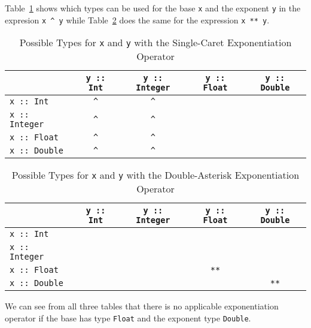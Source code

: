 
Table~\ref{8_9_1} shows which types can be used for the base \verb|x| and the exponent
\verb|y| in the expresion \verb|x ^ y| while Table~\ref{8_9_2} does the same for the
expression \verb|x ** y|.

\begin{table}[!ht]
    \begin{tabular}{ l | c c c c }
        \hline
        \quad & \verb|y :: Int| & \verb|y :: Integer| & \verb|y :: Float| 
        & \verb|y :: Double| \\
        \hline
        \verb|x :: Int| & \verb|^| & \verb|^| & \quad & \quad \\
        \verb|x :: Integer| & \verb|^| & \verb|^| & \quad & \quad \\
        \verb|x :: Float| & \verb|^| & \verb|^| & \quad & \quad \\
        \verb|x :: Double| & \verb|^| & \verb|^| & \quad & \quad \\
        \hline
    \end{tabular}
    \caption{Possible Types for \texttt{x} and \texttt{y} with the Single-Caret 
    Exponentiation Operator \label{8_9_1}}
\end{table}

\begin{table}[!ht]
    \begin{tabular}{ l | c c c c }
        \hline
        \quad & \verb|y :: Int| & \verb|y :: Integer| & \verb|y :: Float| 
        & \verb|y :: Double| \\
        \hline
        \verb|x :: Int| & \quad & \quad & \quad & \quad \\
        \verb|x :: Integer| & \quad & \quad & \quad & \quad \\
        \verb|x :: Float| & \quad & \quad & \verb|**| & \quad \\
        \verb|x :: Double| & \quad & \quad & \quad & \verb|**| \\
        \hline
    \end{tabular}
    \caption{Possible Types for \texttt{x} and \texttt{y} with the Double-Asterisk
    Exponentiation Operator \label{8_9_2}}
\end{table}

We can see from all three tables that there is no applicable exponentiation 
operator if the base has type \verb|Float| and the exponent type \verb|Double|.
